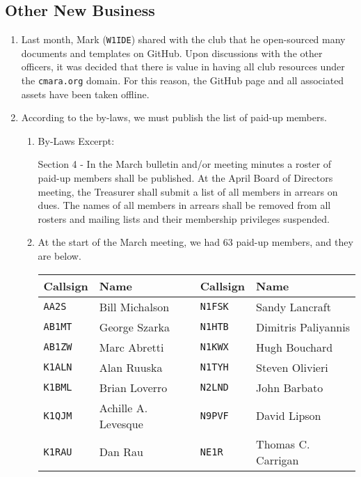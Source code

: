\documentclass[10pt,letterpaper]{article}
\begin{document}
\subsection{Other New Business}
\begin{enumerate}
  \item Last month, Mark (\texttt{W1IDE}) shared with the club that he open-sourced many documents and templates on GitHub. Upon discussions with the other officers, it was decided that there is value in having all club resources under the \texttt{cmara.org} domain. For this reason, the GitHub page and all associated assets have been taken offline.

  \newpage
  \item According to the by-laws, we must publish the list of paid-up members.
  \begin{enumerate}
  \item By-Laws Excerpt:
    \begin{tcolorbox}
Section 4 - In the March bulletin and/or meeting minutes a roster of paid-up members shall be published. At the April Board of Directors meeting, the Treasurer shall submit a list of all members in arrears on dues. The names of all members in arrears shall be removed from all rosters and mailing lists and their membership privileges suspended.
  \end{tcolorbox}
  \item At the start of the March meeting, we had 63 paid-up members, and they are below. \\
  \begin{tabular}{|ll||ll|}
  \hline
  \textbf{Callsign} & \textbf{Name} & \textbf{Callsign} & \textbf{Name} \\
  \hline
  \texttt{AA2S}   & Bill Michalson      & \texttt{N1FSK}  & Sandy Lancraft      \\
  \texttt{AB1MT}  & George Szarka       & \texttt{N1HTB}  & Dimitris Paliyannis \\
  \texttt{AB1ZW}  & Marc Abretti        & \texttt{N1KWX}  & Hugh Bouchard       \\
  \texttt{K1ALN}  & Alan Ruuska         & \texttt{N1TYH}  & Steven Olivieri     \\
  \texttt{K1BML}  & Brian Loverro       & \texttt{N2LND}  & John Barbato        \\
  \texttt{K1QJM}  & Achille A. Levesque & \texttt{N9PVF}  & David Lipson        \\
  \texttt{K1RAU}  & Dan Rau             & \texttt{NE1R}   & Thomas C. Carrigan  \\

\end{tabular}
\end{enumerate}
\end{enumerate}
\end{document}
